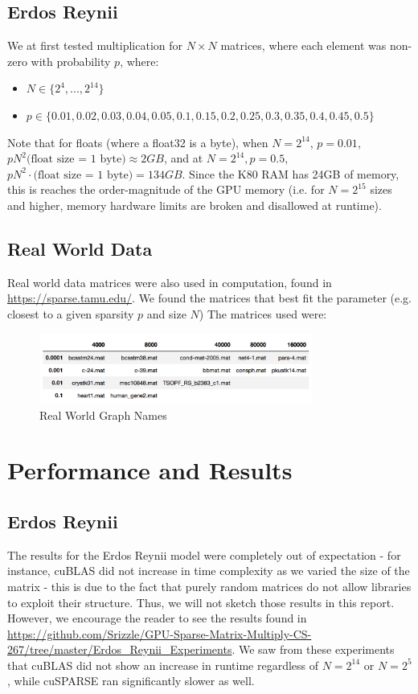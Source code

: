 \documentclass[12pt]{article}
\begin{document}
\subsection{Erdos Reynii}
We at first tested multiplication for $N \times N$ matrices, where each element was non-zero with probability $p$, where: 
\begin{itemize} \item $N \in \{2^{4},...,2^{14} \}$ \item $p \in \{0.01, 0.02, 0.03, 0.04, 0.05, 0.1, 0.15, 0.2, 0.25, 0.3, 0.35, 0.4, 0.45, 0.5\}$
\end{itemize}
Note that for floats (where a float32 is a byte), when $N = 2^{14}$, $p = 0.01$, $pN^{2} \text{(float size = 1 byte)} \approx 2 GB$, and at $N = 2^{14}, p = 0.5$, $pN^{2} \cdot \text{(float size = 1 byte)} = 134 GB$. Since the K80 RAM has 24GB of memory, this is reaches the order-magnitude of the GPU memory (i.e. for $N = 2^{15}$ sizes and higher, memory hardware limits are broken and disallowed at runtime). 



\subsection{Real World Data}
Real world data matrices were also used in computation, found in \url{https://sparse.tamu.edu/}. We found the matrices that best fit the parameter (e.g. closest to a given sparsity $p$ and size $N$) The matrices used were: 
\begin{figure}[h]
  \caption{Real World Graph Names}
  \centering 
  \includegraphics[width = 0.8\textwidth]{matrix_names.png}
\end{figure}


\section{Performance and Results}


\subsection{Erdos Reynii}
The results for the Erdos Reynii model were completely out of expectation - for instance, cuBLAS did not increase in time complexity as we varied the size of the matrix - this is due to the fact that purely random matrices do not allow libraries to exploit their structure. Thus, we will not sketch those results in this report. However, we encourage the reader to see the results found in \url{https://github.com/Srizzle/GPU-Sparse-Matrix-Multiply-CS-267/tree/master/Erdos_Reynii_Experiments}. We saw from these experiments that cuBLAS did not show an increase in runtime regardless of $N = 2^{14}$ or $N = 2^{5}$, while cuSPARSE ran significantly slower as well. 
\end{document}
